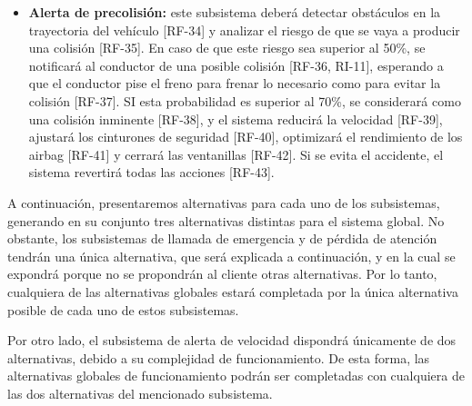 \begin{itemize}[-]
\item \textbf{Alerta de precolisión:} este subsistema deberá detectar obstáculos en la trayectoria del vehículo [RF-34] y analizar el riesgo de que se vaya a producir una colisión [RF-35]. En caso de que este riesgo sea superior al 50\%, se notificará al conductor de una posible colisión [RF-36, RI-11], esperando a que el conductor pise el freno para frenar lo necesario como para evitar la colisión [RF-37]. SI esta probabilidad es superior al 70\%, se considerará como una colisión inminente [RF-38], y el sistema reducirá la velocidad [RF-39], ajustará los cinturones de seguridad [RF-40], optimizará el rendimiento de los airbag [RF-41] y cerrará las ventanillas [RF-42]. Si se evita el accidente, el sistema revertirá todas las acciones [RF-43].
\end{itemize}

A continuación, presentaremos alternativas para cada uno de los subsistemas, generando en su conjunto tres alternativas distintas para el sistema global. No obstante, los subsistemas de llamada de emergencia y de pérdida de atención tendrán una única alternativa, que será explicada a continuación, y en la cual se expondrá porque no se propondrán al cliente otras alternativas. Por lo tanto, cualquiera de las alternativas globales estará completada por la única alternativa posible de cada uno de estos subsistemas.

Por otro lado, el subsistema de alerta de velocidad dispondrá únicamente de dos alternativas, debido a su complejidad de funcionamiento. De esta forma, las alternativas globales de funcionamiento podrán ser completadas con cualquiera de las dos alternativas del mencionado subsistema.
